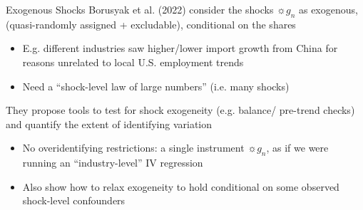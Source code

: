 \documentclass{beamer}
\begin{document}

\begin{frame}{Exogenous Shocks}
Borusyak et al. (2022) consider the shocks $\sun{g_n}$ as exogenous,  (quasi-randomly assigned + excludable), conditional on the shares\smallskip
\begin{itemize}
  \item E.g. different industries saw higher/lower import growth from China for reasons unrelated to local U.S. employment trends\smallskip
  \item Need a ``shock-level law of large numbers'' (i.e. many shocks)
\end{itemize}\bigskip\pause{}

They propose tools to test for shock exogeneity (e.g. balance/ pre-trend checks) and quantify the extent of identifying variation \smallskip
\begin{itemize}
  \item No overidentifying restrictions: a single instrument $\sun{g_n}$, as if we were running an ``industry-level'' IV regression \smallskip
  \item Also show how to relax exogeneity to hold conditional on some observed shock-level confounders
\end{itemize}

\end{frame}


\end{document}

